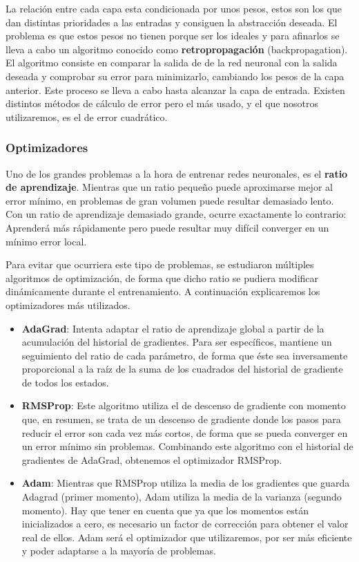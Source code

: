 La relación entre cada capa esta condicionada por unos pesos, estos son los que dan distintas prioridades a las entradas y consiguen la abstracción deseada. El problema es que estos pesos no tienen porque ser los ideales y para afinarlos se lleva a cabo un algoritmo conocido como \textbf{retropropagación} (backpropagation). El algoritmo consiste en comparar la salida de de la red neuronal con la salida deseada y comprobar su error para minimizarlo, cambiando los pesos de la capa anterior. Este proceso se lleva a cabo hasta alcanzar la capa de entrada. Existen distintos métodos de cálculo de error pero el más usado, y el que nosotros utilizaremos, es el de error cuadrático.

\subsubsection{Optimizadores}
Uno de los grandes problemas a la hora de entrenar redes neuronales, es el \textbf{ratio de aprendizaje}. Mientras que un ratio pequeño puede aproximarse mejor al error mínimo, en problemas de gran volumen puede resultar demasiado lento. Con un ratio de aprendizaje demasiado grande, ocurre exactamente lo contrario: Aprenderá más rápidamente pero puede resultar muy difícil converger en un mínimo error local.

Para evitar que ocurriera este tipo de problemas, se estudiaron múltiples algoritmos de optimización, de forma que dicho ratio se pudiera modificar dinámicamente durante el entrenamiento. A continuación explicaremos los optimizadores más utilizados.

\begin{itemize}
    \item \textbf{AdaGrad}: Intenta adaptar el ratio de aprendizaje global a partir de la acumulación del historial de gradientes. Para ser específicos, mantiene un seguimiento del ratio de cada parámetro, de forma que éste sea inversamente proporcional a la raíz de la suma de los cuadrados del historial de gradiente de todos los estados. 
    \item \textbf{RMSProp}: Este algoritmo utiliza el de descenso de gradiente con momento que, en resumen, se trata de un descenso de gradiente donde los pasos para reducir el error son cada vez más cortos, de forma que se pueda converger en un error mínimo sin problemas. Combinando este algoritmo con el historial de gradientes de AdaGrad, obtenemos el optimizador RMSProp. 
    \item \textbf{Adam}: Mientras que RMSProp utiliza la media de los gradientes que guarda Adagrad (primer momento), Adam utiliza la media de la varianza (segundo momento). Hay que tener en cuenta que ya que los momentos están inicializados a cero, es necesario un factor de corrección para obtener el valor real de ellos. Adam será el optimizador que utilizaremos, por ser más eficiente y poder adaptarse a la mayoría de problemas. 
\end{itemize}

